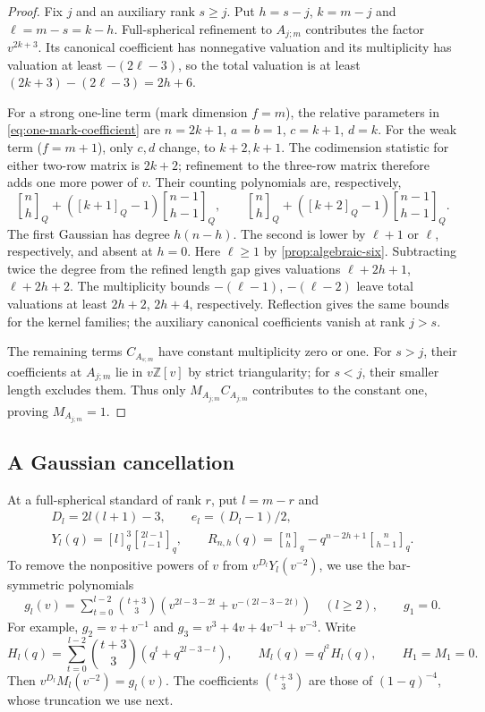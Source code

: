 \documentclass[a4paper,11pt]{amsart}
\numberwithin{equation}{subsection}
\theoremstyle{plain}
\theoremstyle{definition}
\theoremstyle{remark}
\newcommand{\qbinom}[2]{\genfrac{[}{]}{0pt}{}{#1}{#2}}
\begin{document}
\begin{proof}
Fix $j$ and an auxiliary rank $s\ge j$. Put $h=s-j$,
$k=m-j$ and $\ell=m-s=k-h$. Full-spherical refinement to
$A_{j;m}$ contributes the factor $v^{2k+3}$. Its canonical
coefficient has nonnegative valuation and its multiplicity has
valuation at least $-(2\ell-3)$, so the total valuation is at least
$(2k+3)-(2\ell-3)=2h+6$.

For a strong one-line term (mark dimension $f=m$), the relative
parameters in \autoref{eq:one-mark-coefficient} are
$n=2k+1$, $a=b=1$, $c=k+1$, $d=k$.
For the weak term ($f=m+1$), only $c,d$ change, to $k+2,k+1$.
The codimension statistic for either two-row matrix is $2k+2$;
refinement to the three-row matrix therefore adds one more power of
$v$.  Their counting polynomials are, respectively,
\[
\qbinom{n}{h}_Q+([k+1]_Q-1)\qbinom{n-1}{h-1}_Q,
\qquad
\qbinom{n}{h}_Q+([k+2]_Q-1)\qbinom{n-1}{h-1}_Q.
\]
The first Gaussian has degree $h(n-h)$. The second is lower
by $\ell+1$ or $\ell$, respectively, and absent at $h=0$.
Here $\ell\ge1$ by \autoref{prop:algebraic-six}. Subtracting
twice the degree from the refined length gap gives valuations
$\ell+2h+1$, $\ell+2h+2$. The multiplicity bounds
$-(\ell-1)$, $-(\ell-2)$ leave total valuations at least
$2h+2$, $2h+4$, respectively. Reflection gives the same bounds for
the kernel families; the auxiliary canonical coefficients vanish
at rank $j>s$.

The remaining terms $C_{A_{s;m}}$ have constant
multiplicity zero or one. For $s>j$, their coefficients at
$A_{j;m}$ lie in $v\mathbb Z[v]$ by strict triangularity; for
$s<j$, their smaller length excludes them. Thus only
$M_{A_{j;m}}C_{A_{j;m}}$ contributes to the constant one, proving
$M_{A_{j;m}}=1$.
\end{proof}

\subsection{A Gaussian cancellation}

At a full-spherical standard of rank $r$, put $l=m-r$ and
\[
\begin{gathered}
D_l=2l(l+1)-3,\qquad e_l=(D_l-1)/2,\\
Y_l(q)=[l]_q^3\qbinom{2l-1}{l-1}_q,\qquad
R_{n,h}(q)=\qbinom{n}{h}_q-q^{n-2h+1}\qbinom{n}{h-1}_q.
\end{gathered}
\]
To remove the nonpositive powers of $v$ from
$v^{D_l}Y_l(v^{-2})$, we use the bar-symmetric polynomials
\begin{gather*}
g_l(v)=\sum_{t=0}^{l-2}\binom{t+3}{3}
\left(v^{2l-3-2t}+v^{-(2l-3-2t)}\right)\quad(l\ge2),
\qquad g_1=0.
\end{gather*}
For example, $g_2=v+v^{-1}$ and
$g_3=v^3+4v+4v^{-1}+v^{-3}$.
Write
\[
H_l(q)=\sum_{t=0}^{l-2}\binom{t+3}{3}
(q^t+q^{2l-3-t}),\qquad M_l(q)=q^{l^2}H_l(q),
\qquad H_1=M_1=0.
\]
Then $v^{D_l}M_l(v^{-2})=g_l(v)$. The coefficients
$\binom{t+3}{3}$ are those of $(1-q)^{-4}$, whose truncation we use next.
\end{document}
